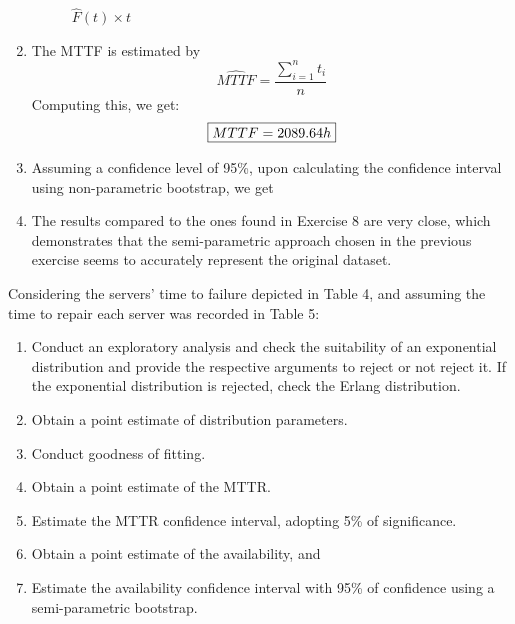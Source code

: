 \documentclass{article}
\begin{document}
\begin{enumerate}[label=(\alph*)]
\begin{figure}[H]
            \caption{$\hat{F}(t) \times t$}
            \label{fig:q9_lt}
        \end{figure}
        \item The MTTF is estimated by
        \[\widehat{MTTF} = \frac{\sum_{i=1}^{n}t_i}{n}\]
        Computing this, we get:
        \[\fbox{$MTTF = 2089.64h$}\]
        \item Assuming a confidence level of 95\%, upon calculating the confidence interval using non-parametric bootstrap, we get 
        \item The results compared to the ones found in Exercise 8 are very close, which demonstrates that the semi-parametric approach chosen in the previous exercise seems to accurately represent the original dataset.
    \end{enumerate}


\setcounter{Question}{9}
\begin{question}
    Considering the servers' time to failure depicted in Table 4, and assuming the time to repair each server was recorded in Table 5:
\begin{enumerate}[label=(\alph*)]
    \item Conduct an exploratory analysis and check the suitability of an exponential distribution and provide the respective arguments to reject or not reject it. If the exponential distribution is rejected, check the Erlang distribution.
    \item Obtain a point estimate of distribution parameters.
    \item Conduct goodness of fitting.
    \item Obtain a point estimate of the MTTR.
    \item Estimate the MTTR confidence interval, adopting 5\% of significance.
    \item Obtain a point estimate of the availability, and
    \item Estimate the availability confidence interval with 95\% of confidence using a semi-parametric bootstrap.
\end{enumerate}
\end{question}
\end{document}
